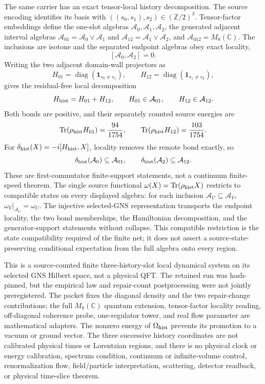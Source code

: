 \documentclass[11pt]{article}
\theoremstyle{remark}
\theoremstyle{plain}
\begin{document}
The same carrier has an exact tensor-local history decomposition.  The
source encoding identifies its basis with
\(((s_0,s_1),s_2)\in(\mathbb Z/2)^3\).  Tensor-factor embeddings define the
one-slot algebras \(\mathcal A_0,\mathcal A_1,\mathcal A_2\), the generated
adjacent interval algebras
\(\mathcal A_{01}=\mathcal A_0\vee\mathcal A_1\) and
\(\mathcal A_{12}=\mathcal A_1\vee\mathcal A_2\), and
\(\mathcal A_{012}=M_8(\mathbb C)\).  The inclusions are isotone and the
separated endpoint algebras obey exact locality,
\[
 [\mathcal A_0,\mathcal A_2]=0.
\]
Writing the two adjacent domain-wall projectors as
\[
 H_{01}=\operatorname{diag}(\mathbf 1_{s_0\ne s_1}),\qquad
 H_{12}=\operatorname{diag}(\mathbf 1_{s_1\ne s_2}),
\]
gives the residual-free local decomposition
\[
 H_{\rm hist}=H_{01}+H_{12},\qquad
 H_{01}\in\mathcal A_{01},\qquad H_{12}\in\mathcal A_{12}.
\]
Both bonds are positive, and their separately counted source energies are
\[
 \operatorname{Tr}(\rho_{\rm hist}H_{01})=\frac{94}{1754},\qquad
 \operatorname{Tr}(\rho_{\rm hist}H_{12})=\frac{103}{1754}.
\]
For \(\delta_{\rm hist}(X)=-i[H_{\rm hist},X]\), locality removes the
remote bond exactly, so
\[
 \delta_{\rm hist}(\mathcal A_0)\subseteq\mathcal A_{01},\qquad
 \delta_{\rm hist}(\mathcal A_2)\subseteq\mathcal A_{12}.
\]
These are first-commutator finite-support statements, not a continuum
finite-speed theorem.  The single source functional
\(\omega(X)=\operatorname{Tr}(\rho_{\rm hist}X)\) restricts to compatible
states on every displayed algebra: for each inclusion
\(\mathcal A_U\subseteq\mathcal A_V\),
\(\omega_V|_{\mathcal A_U}=\omega_U\).  The injective selected-GNS
representation transports the endpoint locality, the two bond memberships,
the Hamiltonian decomposition, and the generator-support statements without
collapse.  This compatible restriction is the state compatibility required
of the finite net; it does not assert a source-state-preserving conditional
expectation from the full algebra onto every region.

This is a source-counted finite three-history-slot local dynamical system on
its selected GNS Hilbert space, not a physical QFT. The retained run was
hash-pinned, but the empirical law and repair-count postprocessing were not
jointly preregistered. The packet fixes the diagonal density and the two
repair-change contributions; the full \(M_8(\mathbb C)\) quantum extension,
tensor-factor locality reading, off-diagonal coherence probe, one-regulator
tower, and real flow parameter are mathematical adapters.  The nonzero energy
of \(\Omega_{\rm hist}\) prevents its promotion to a vacuum or ground vector.
The three successive history coordinates are not calibrated physical times or
Lorentzian regions, and there is no physical clock or energy calibration,
spectrum condition, continuum or infinite-volume control, renormalization
flow, field/particle interpretation, scattering, detector readback, or
physical time-slice theorem.
\end{document}
